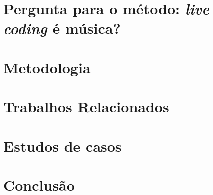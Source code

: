 \documentclass[
	12pt,				%
	openright,			%
	twoside,			%
	a4paper,			%
	english,			%
	french,				%
	spanish,			%
        italian,                        %
	brazil				%
	]{abntex2}
\begin{document}
\begingroup
\let\clearpage\relax
\chapter{Pergunta para o método: \emph{live coding} é música?}\label{cap:introducao}

\endgroup

\begingroup
\let\clearpage\relax
\chapter{Metodologia}\label{cap:metodologia}

\endgroup

\begingroup
\let\clearpage\relax
\chapter{Trabalhos Relacionados}\label{cap:trabalhos_relacionados}

\endgroup

\begingroup
\let\clearpage\relax
\chapter{Estudos de casos}\label{cap:estudos_de_caso}

\endgroup

\chapter{Conclusão}

\postextual



%
%


\partapendices

\begin{apendicesenv}

\end{apendicesenv}

\printindex
\end{document}
